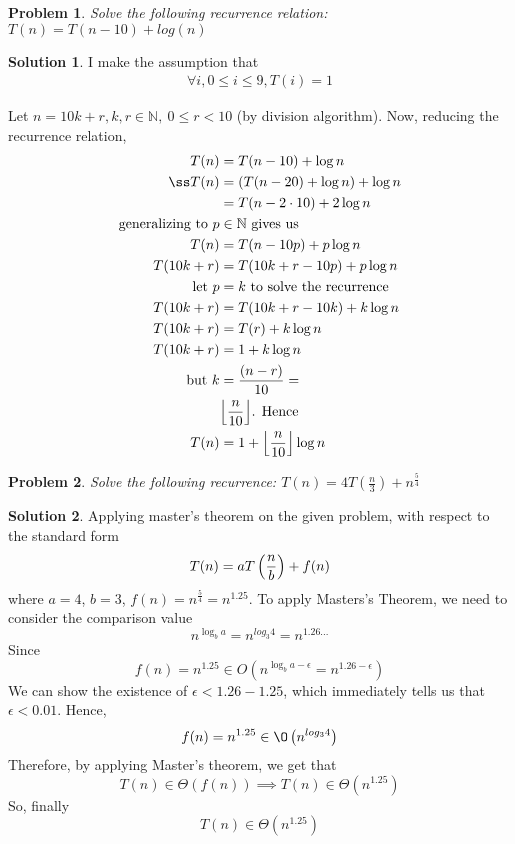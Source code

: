 \documentclass[11pt]{article}
\newtheorem*{problem}{Problem}
\theoremstyle{definition}
\newtheorem*{solution}{Solution}
\DeclarePairedDelimiter\floor{\lfloor}{\rfloor}
\begin{document}
\begin{problem}
    Solve the following recurrence relation: $T(n) = T(n - 10) + log(n)$
\end{problem}
\begin{solution}
    I make the assumption that
    \begin{gather*}
        \forall i, 0 \leq i \leq 9, T(i) = 1
    \end{gather*}

    Let $n = 10k + r, k, r \in \mathbb N, \ 0 \leq r < 10$ (by division algorithm). Now, reducing the recurrence relation,
    \begin{align*}
        T(n) &= T(n - 10) + \log n \\ß
        T(n) &= (T(n - 20) + \log n) + \log n \\
        	 &= T(n - 2 \cdot 10) + 2 \log n \\
        \text{generalizing to } p &\in \mathbb N \text{ gives us} \\
        T(n) &= T(n - 10p) + p \log n  \\
        T(10k + r) &= T(10k + r - 10p) + p \log n \\
        \text{let } p &= k \text{ to solve the recurrence} \\
        T(10k + r) &= T(10k + r -10k) + k \log n \\
        T(10k + r) &= T(r) + k \log n \\
        T(10k + r) &= 1 + k \log n \\
        \text{but } k &= \frac{(n - r)}{10} = \\
        			 &\floor*{\frac{n}{10}} \text{. Hence} \\
        T(n) &= 1 + \floor*{\frac{n}{10}} \log n
    \end{align*}
\end{solution}


\begin{problem}
    Solve the following recurrence: $T(n) = 4T(\frac n 3) + n^{\frac 5 4}$
\end{problem}
\begin{solution}
    Applying master's theorem on the given problem, with respect to the standard form
    $$
    T(n) = aT \left( \frac{n}{b} \right) + f(n) \\
    $$
    where $a = 4$, $b = 3$, $f(n) = n^{\frac 5 4} = n^{1.25}$.
    To apply Masters's Theorem, we need to consider the comparison value
    $$n^{\log_b a} = n^{log_3 4} = n^{1.26...}$$
    Since
    $$
    f(n) = n^{1.25} \in O(n^{\log_b a - \epsilon} = n^{1.26 - \epsilon})
    $$
    We can show the existence of $\epsilon < 1.26 - 1.25$, which immediately tells us that $\epsilon < 0.01$. Hence,
    $$
    f(n) = n^{1.25} \in \O \left( n^{log_3 4} \right)
    $$
    Therefore, by applying Master's theorem, we get that 
    $$
    T(n) \in \Theta \left( f(n) \right) \implies T(n) \in \Theta \left( n^{1.25} \right)
    $$
    So, finally
    $$
    T(n) \in \Theta \left( n^{1.25} \right)
    $$
\end{solution}
\end{document}
